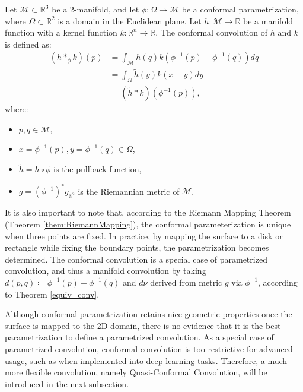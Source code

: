 \begin{definition}
Let $\mathcal{M} \subset \mathbb{R}^3$ be a 2-manifold, and let $\phi: \Omega \to \mathcal{M}$ be a conformal parametrization, where $\Omega \subset \mathbb{R}^2$ is a domain in the Euclidean plane. Let $h: \mathcal{M} \to \mathbb{R}$ be a manifold function with a kernel function $k: \mathbb{R}^{n}\to \mathbb{R}$. The conformal convolution of $h$ and $k$ is defined as:
\begin{equation}
\begin{aligned}
(h \ast_\phi k)(p) &= \int_\mathcal{M} h(q) k(\phi^{-1}(p) - \phi^{-1}(q)) dq \\
&= \int_{\Omega} \tilde{h}(y) k(x - y) dy \\
&= (\tilde{h} \ast k)(\phi^{-1}(p)),
\end{aligned}
\end{equation}
where:
\begin{itemize}
    \item $p,q \in \mathcal{M}$,
    \item $x=\phi^{-1}(p), y=\phi^{-1}(q) \in \Omega$,
    \item $\tilde{h} = h \circ \phi$ is the pullback function,
    \item $g = (\phi^{-1})^* g_{\mathbb{R}^2}$ is the Riemannian metric of $\mathcal{M}$.
\end{itemize}
\label{def:conformalconv}
\end{definition}

It is also important to note that, according to the Riemann Mapping Theorem (Theorem \ref{them:RiemannMapping}), the conformal parameterization is unique when three points are fixed. In practice, by mapping the surface to a disk or rectangle while fixing the boundary points, the parametrization becomes determined. The conformal convolution is a special case of parametrized convolution, and thus a manifold convolution by taking $d(p,q) \coloneqq   \phi^{-1}(p) - \phi^{-1}(q)$ and $d\nu$ derived from metric $g$  via $\phi^{-1}$, according to Theorem \ref{equiv_conv}. 

Although conformal parametrization retains nice geometric properties once the surface is mapped to the 2D domain, there is no evidence that it is the best parametrization to define a parametrized convolution. As a special case of parametrized convolution, conformal convolution is too restrictive for advanced usage, such as when implemented into deep learning tasks. Therefore, a much more flexible convolution, namely Quasi-Conformal Convolution, will be introduced in the next subsection.

